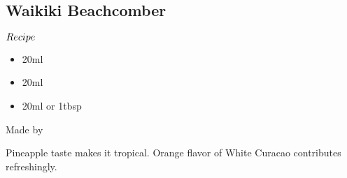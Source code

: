 \subsection{Waikiki Beachcomber}
\begin{itembox}[l]{\boldmath $Recipe$}
\begin{itemize}
\setlength{\parskip}{0cm}
\setlength{\itemsep}{0cm}
\item \gin 20ml
\item \wc 20ml
\item \pj 20ml or 1tbsp
\end{itemize}
\vspace{-4mm}
Made by \shake
\end{itembox}
Pineapple taste makes it tropical. Orange flavor of White Curacao contributes refreshingly.
